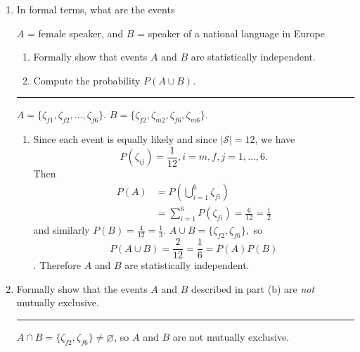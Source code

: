 \documentclass{article}
\newcommand{\horline}
           {\begin{center}
              \noindent\rule{8cm}{0.4pt}
            \end{center}}
\begin{document}
\begin{enumerate}[label=(\alph*)]
\item{In formal terms, what are the events
      \begin{center}
        $A$ = female speaker, and $B$ = speaker of a national language in
        Europe
      \end{center}
      \begin{enumerate}[label=(\roman*)]
        \item{Formally show that events $A$ and $B$ are statistically
              independent.
             }
        \item{Compute the probability $P(A \cup B)$.
             }
      \end{enumerate}
      \horline
      $A = \{ \zeta_{f1}, \zeta_{f2}, \dots, \zeta_{f6} \}$.
      $B = \{ \zeta_{f2}, \zeta_{m2}, \zeta_{f6}, \zeta_{m6} \}$.
      \begin{enumerate}[label=(\roman*)]
        \item{Since each event is equally likely and since 
              $|\mathcal{S}| = 12$, we have
              $$P(\zeta_{ij}) = \frac{1}{12}, i = m,f, j = 1, \dots, 6.$$
              Then 
              \begin{align*}
              P(A) & = P\left(\bigcup_{i=1}^6 \zeta_{fi} \right) \\
                   & = \sum_{i=1}^6 P(\zeta_{fi})  = \frac{6}{12} 
                                                   = \frac{1}{2}
              \end{align*}
              and similarly $P(B) = \frac{4}{12} = \frac{1}{3}$.
              $A \cup B = \{\zeta_{f2}, \zeta_{f6}\},$ so 
              $$P(A \cup B) = \frac{2}{12} = \frac{1}{6} = P(A)P(B)$$.
              Therefore $A$ and $B$ are statistically independent.
             }
      \end{enumerate}
     }
\item{Formally show that the events $A$ and $B$ described in part (b) are
      \textit{not} mutually exclusive.
      \horline
       $A \cap B = \{ \zeta_{f2}, \zeta_{f6} \} \neq \varnothing$, so
       $A$ and $B$ are not mutually exclusive.
     }
\end{enumerate}
\end{document}
